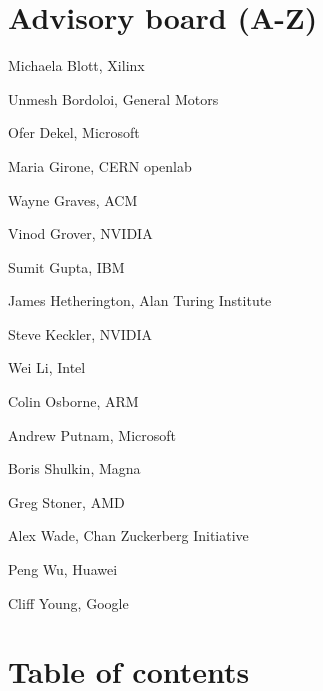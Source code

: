 \documentclass[10pt,onecolumn]{article}
\newenvironment{packed_itemize}{
\begin{itemize}
  \setlength{\itemsep}{1pt}
  \setlength{\parskip}{0pt}
  \setlength{\parsep}{0pt}
}{\end{itemize}}
\begin{document}
\section*{Advisory board (A-Z)}

\begin{packed_itemize}

 \item Michaela Blott, Xilinx
 \item Unmesh Bordoloi, General Motors
 \item Ofer Dekel, Microsoft
 \item Maria Girone, CERN openlab
 \item Wayne Graves, ACM
 \item Vinod Grover, NVIDIA
 \item Sumit Gupta, IBM
 \item James Hetherington, Alan Turing Institute
 \item Steve Keckler, NVIDIA
 \item Wei Li, Intel
 \item Colin Osborne, ARM
 \item Andrew Putnam, Microsoft
 \item Boris Shulkin, Magna
 \item Greg Stoner, AMD
 \item Alex Wade, Chan Zuckerberg Initiative
 \item Peng Wu, Huawei
 \item Cliff Young, Google 

\end{packed_itemize}

\section*{Table of contents}
\label{sec:overview}
\end{document}
